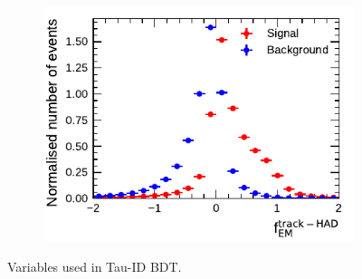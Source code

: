 \begin{figure}[!ht]
\begin{subfigure}{0.5\textwidth}
  \end{subfigure}%
  \begin{subfigure}{0.5\textwidth}
    \centering
    \includegraphics{./figures/baseline_bdt_vars/1p/ChPiEMEOverCaloEME.pdf}
  \end{subfigure}
  \caption{Variables used in Tau-ID BDT. }
  \label{fig:bdt_vars_1p_overlays}
\end{figure}

